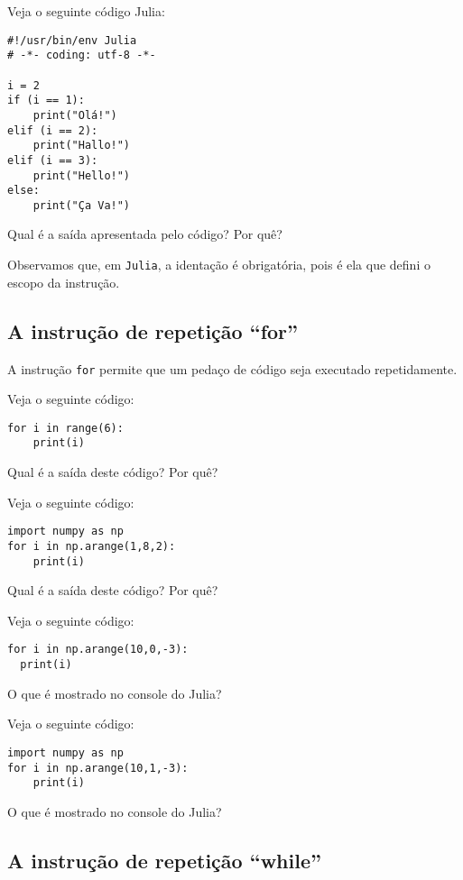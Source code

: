 \begin{ex}
  Veja o seguinte código Julia:
\begin{lstlisting}
#!/usr/bin/env Julia
# -*- coding: utf-8 -*-

i = 2
if (i == 1):
    print("Olá!")
elif (i == 2):
    print("Hallo!")
elif (i == 3):
    print("Hello!")
else:
    print("Ça Va!")
\end{lstlisting}
Qual é a saída apresentada pelo código? Por quê?
\end{ex}

Observamos que, em \verb+Julia+, a identação é obrigatória, pois é ela que defini o escopo da instrução.

\subsection{A instrução de repetição ``for''}

A instrução \verb+for+ permite que um pedaço de código seja executado repetidamente.

\begin{ex}
  Veja o seguinte código:
\begin{lstlisting}
for i in range(6):
    print(i)
\end{lstlisting}
Qual é a saída deste código? Por quê?
\end{ex}

\begin{ex}
  Veja o seguinte código:
\begin{lstlisting}
import numpy as np
for i in np.arange(1,8,2):
    print(i)
\end{lstlisting}
Qual é a saída deste código? Por quê?
\end{ex}

\begin{ex}
  Veja o seguinte código:
\begin{lstlisting}
for i in np.arange(10,0,-3):
  print(i)
\end{lstlisting}
O que é mostrado no console do Julia?
\end{ex}

\begin{ex}
  Veja o seguinte código:
\begin{lstlisting}
import numpy as np
for i in np.arange(10,1,-3):
    print(i)
\end{lstlisting}
O que é mostrado no console do Julia?
\end{ex}

\subsection{A instrução de repetição ``while''}


